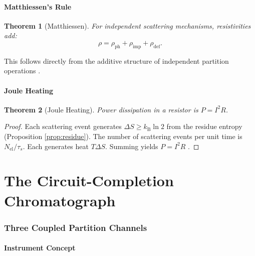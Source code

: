 \documentclass[twocolumn,10pt,a4paper]{article}
\newtheorem{theorem}{Theorem}[section]
\theoremstyle{definition}
\theoremstyle{remark}
\newcommand{\kB}{k_{\mathrm{B}}}
\begin{document}
\subsection{Matthiessen's Rule}

\begin{theorem}[Matthiessen]
\label{thm:matthiessen}
For independent scattering mechanisms, resistivities add:
\begin{equation}
\rho = \rho_{\mathrm{ph}} + \rho_{\mathrm{imp}} + \rho_{\mathrm{def}}.
\end{equation}
\end{theorem}

This follows directly from the additive structure of independent partition operations \citep{matthiessen1864}.

\subsection{Joule Heating}

\begin{theorem}[Joule Heating]
\label{thm:joule}
Power dissipation in a resistor is $P = I^2 R$.
\end{theorem}

\begin{proof}
Each scattering event generates $\Delta S \geq \kB \ln 2$ from the residue entropy (Proposition \ref{prop:residue}). The number of scattering events per unit time is $N_{\mathrm{el}}/\tau_s$. Each generates heat $T \Delta S$. Summing yields $P = I^2 R$ \citep{joule1841,boltzmann1877}.
\end{proof}

\part{The Circuit-Completion Chromatograph}

\section{Three Coupled Partition Channels}
\label{sec:cccg}

\subsection{Instrument Concept}
\end{document}
